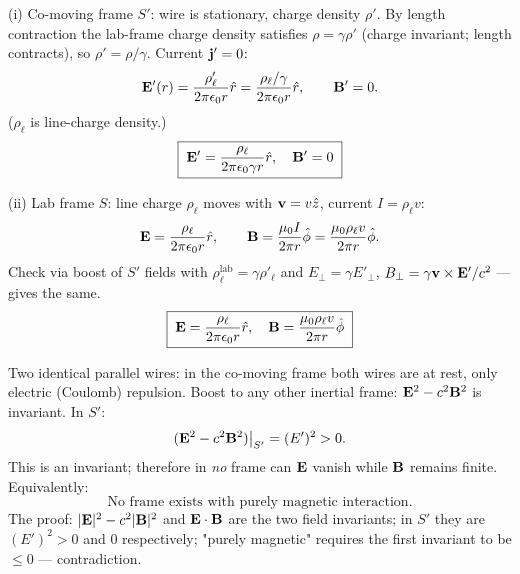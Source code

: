 \documentclass[11pt]{article}
\begin{document}
(i) Co-moving frame $S'$: wire is stationary, charge density $\rho'$. By length contraction the lab-frame charge density satisfies $\rho = \gamma\rho'$ (charge invariant; length contracts), so $\rho' = \rho/\gamma$. Current $\vb j' = 0$:
\[ \vb E'(r) = \frac{\rho'_\ell}{2\pi\epsilon_0 r}\hat r = \frac{\rho_\ell/\gamma}{2\pi\epsilon_0 r}\hat r,\qquad \vb B' = 0. \]
($\rho_\ell$ is line-charge density.)
\[ \boxed{\;\vb E' = \frac{\rho_\ell}{2\pi\epsilon_0\gamma r}\hat r,\quad \vb B' = 0\;} \]

(ii) Lab frame $S$: line charge $\rho_\ell$ moves with $\vb v = v\hat z$, current $I = \rho_\ell v$:
\[ \vb E = \frac{\rho_\ell}{2\pi\epsilon_0 r}\hat r,\qquad \vb B = \frac{\mu_0 I}{2\pi r}\hat\phi = \frac{\mu_0\rho_\ell v}{2\pi r}\hat\phi. \]
Check via boost of $S'$ fields with $\rho_\ell^\text{lab} = \gamma\rho'_\ell$ and $E_\perp = \gamma E'_\perp$, $B_\perp = \gamma\vb v\times\vb E'/c^2$ — gives the same.
\[ \boxed{\;\vb E = \frac{\rho_\ell}{2\pi\epsilon_0 r}\hat r,\quad \vb B = \frac{\mu_0\rho_\ell v}{2\pi r}\hat\phi\;} \]

Two identical parallel wires: in the co-moving frame both wires are at rest, only electric (Coulomb) repulsion. Boost to any other inertial frame: $\vb E^2 - c^2\vb B^2$ is invariant. In $S'$:
\[ (\vb E^2 - c^2\vb B^2)\big|_{S'} = (E')^2 > 0. \]
This is an invariant; therefore in \emph{no} frame can $\vb E$ vanish while $\vb B$ remains finite. Equivalently:
\[ \boxed{\;\text{No frame exists with purely magnetic interaction.}\;} \]
The proof: $|\vb E|^2 - c^2|\vb B|^2$ and $\vb E\cdot\vb B$ are the two field invariants; in $S'$ they are $(E')^2>0$ and $0$ respectively; "purely magnetic" requires the first invariant to be $\le 0$ — contradiction.
\end{document}

